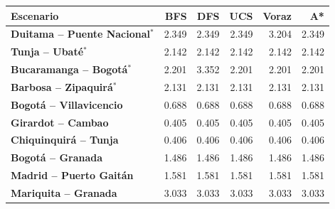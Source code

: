 \renewcommand{\arraystretch}{1.2}
\begin{tabular}{|l|r|r|r|r|r|}
\hline
\rowcolor{gray!20} \textbf{Escenario} & \textbf{BFS} & \textbf{DFS} & \textbf{UCS} & \textbf{Voraz} & \textbf{A*} \\
\hline
\textbf{Duitama -- Puente Nacional$^{*}$} & 2.349 & 2.349 & 2.349 & 3.204 & 2.349 \\
\hline
\textbf{Tunja -- Ubaté$^{*}$} & 2.142 & 2.142 & 2.142 & 2.142 & 2.142 \\
\hline
\textbf{Bucaramanga -- Bogotá$^{*}$} & 2.201 & 3.352 & 2.201 & 2.201 & 2.201 \\
\hline
\textbf{Barbosa -- Zipaquirá$^{*}$} & 2.131 & 2.131 & 2.131 & 2.131 & 2.131 \\
\hline
\textbf{Bogotá -- Villavicencio} & 0.688 & 0.688 & 0.688 & 0.688 & 0.688 \\
\hline
\textbf{Girardot -- Cambao} & 0.405 & 0.405 & 0.405 & 0.405 & 0.405 \\
\hline
\textbf{Chiquinquirá -- Tunja} & 0.406 & 0.406 & 0.406 & 0.406 & 0.406 \\
\hline
\textbf{Bogotá -- Granada} & 1.486 & 1.486 & 1.486 & 1.486 & 1.486 \\
\hline
\textbf{Madrid -- Puerto Gaitán} & 1.581 & 1.581 & 1.581 & 1.581 & 1.581 \\
\hline
\textbf{Mariquita -- Granada} & 3.033 & 3.033 & 3.033 & 3.033 & 3.033 \\
\hline
\end{tabular}
